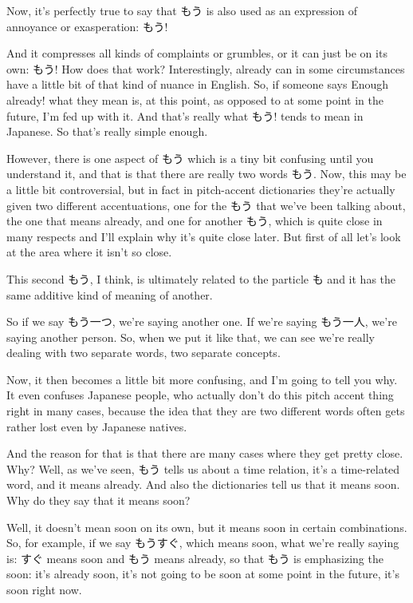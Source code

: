 Now, it's perfectly true to say that もう is also used as an expression of annoyance or exasperation: もう!

{}

And it compresses all kinds of complaints or grumbles, or it can just be on its own: もう! How does that work? Interestingly, already can in some circumstances have a little bit of that kind of nuance in English. So, if someone says Enough already! what they mean is, at this point, as opposed to at some point in the future, I'm fed up with it. And that's really what もう! tends to mean in Japanese. So that's really simple enough.

\startsectionlevel[title={Second もう?},reference={second-もう}]

However, there is one aspect of もう which is a tiny bit confusing until you understand it, and that is that there are really two words もう. Now, this may be a little bit controversial, but in fact in pitch-accent dictionaries they're actually given two different accentuations, one for the もう that we've been talking about, the one that means already, and one for another もう, which is quite close in many respects and I'll explain why it's quite close later. But first of all let's look at the area where it isn't so close.

This second もう, I think, is ultimately related to the particle も and it has the same additive kind of meaning of another.

{}

So if we say もう一つ, we're saying another one. If we're saying もう一人, we're saying another person. So, when we put it like that, we can see we're really dealing with two separate words, two separate concepts.

Now, it then becomes a little bit more confusing, and I'm going to tell you why. It even confuses Japanese people, who actually don't do this pitch accent thing right in many cases, because the idea that they are two different words often gets rather lost even by Japanese natives.

And the reason for that is that there are many cases where they get pretty close. Why? Well, as we've seen, もう tells us about a time relation, it's a time-related word, and it means already. And also the dictionaries tell us that it means soon. Why do they say that it means soon?

Well, it doesn't mean soon on its own, but it means soon in certain combinations. So, for example, if we say もうすぐ, which means soon, what we're really saying is: すぐ means soon and もう means already, so that もう is emphasizing the soon: it's already soon, it's not going to be soon at some point in the future, it's soon right now.


